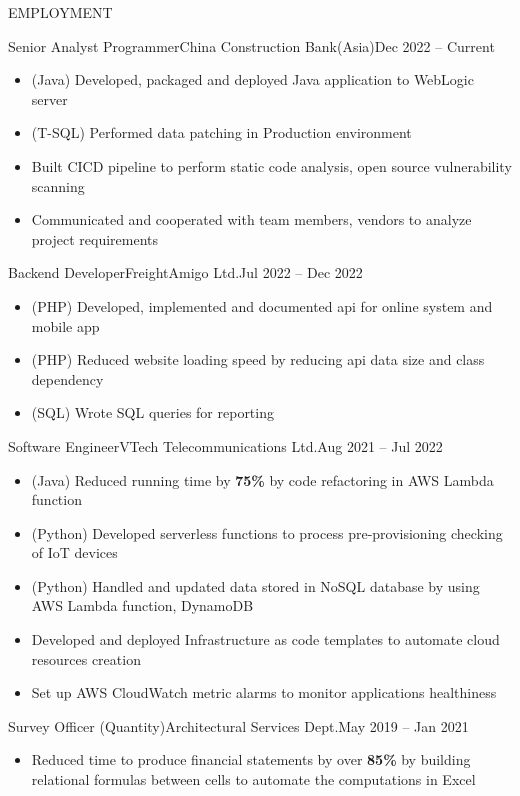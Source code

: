 \documentclass[]{resume}
\begin{document}
	\makeheader
	
	\begin{cvsection}{EMPLOYMENT}
		\begin{cvsubsection}{Senior Analyst Programmer}{China Construction Bank(Asia)}{Dec 2022 -- Current}
			\begin{itemize}
				\item (Java) Developed, packaged and deployed Java application to WebLogic server
				\item (T-SQL) Performed data patching in Production environment 
				\item Built CICD pipeline to perform static code analysis, open source vulnerability scanning
				\item Communicated and cooperated with team members, vendors to analyze project requirements
			\end{itemize}
		\end{cvsubsection}
		
		\begin{cvsubsection}{Backend Developer}{FreightAmigo Ltd.}{Jul 2022 -- Dec 2022}
			\begin{itemize}
				\item (PHP) Developed, implemented and documented api for online system and mobile app
				\item (PHP) Reduced website loading speed by reducing api data size and class dependency
				\item (SQL) Wrote SQL queries for reporting
			\end{itemize}
		\end{cvsubsection}
		
		\begin{cvsubsection}{Software Engineer}{VTech Telecommunications Ltd.}{Aug 2021 -- Jul 2022}
			\begin{itemize}
				\item (Java) Reduced running time by \textbf{75\%} by code refactoring in AWS Lambda function
				\item (Python) Developed serverless functions to process pre-provisioning checking of IoT devices
				\item (Python) Handled and updated data stored in NoSQL database by using AWS Lambda function, DynamoDB
				\item Developed and deployed Infrastructure as code templates to automate cloud resources creation
				\item Set up AWS CloudWatch metric alarms to monitor applications healthiness
			\end{itemize}
		\end{cvsubsection}
		
		\begin{cvsubsection}{Survey Officer (Quantity)}{Architectural Services Dept.}{May 2019 -- Jan 2021}	
			\begin{itemize}
				\item Reduced time to produce financial statements by over \textbf{85\%} by building relational formulas between cells to automate the computations in Excel
			\end{itemize}
		\end{cvsubsection}
	\end{cvsection}
\end{document}
